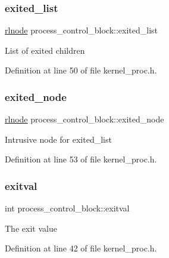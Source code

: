 \subsubsection{\texorpdfstring{exited\+\_\+list}{exited\_list}}
{\footnotesize\ttfamily \hyperlink{group__rlists_ga8f6244877f7ce2322c90525217ea6e7a}{rlnode} process\+\_\+control\+\_\+block\+::exited\+\_\+list}

List of exited children 

Definition at line 50 of file kernel\+\_\+proc.\+h.

\mbox{\label{structprocess__control__block_a9e0d93783a89bd92f39243353f04a27e}} 
\subsubsection{\texorpdfstring{exited\+\_\+node}{exited\_node}}
{\footnotesize\ttfamily \hyperlink{group__rlists_ga8f6244877f7ce2322c90525217ea6e7a}{rlnode} process\+\_\+control\+\_\+block\+::exited\+\_\+node}

Intrusive node for {\ttfamily exited\+\_\+list} 

Definition at line 53 of file kernel\+\_\+proc.\+h.

\mbox{\label{structprocess__control__block_add9b4f6d506a3538be7b53411e94fd28}} 
\subsubsection{\texorpdfstring{exitval}{exitval}}
{\footnotesize\ttfamily int process\+\_\+control\+\_\+block\+::exitval}

The exit value 

Definition at line 42 of file kernel\+\_\+proc.\+h.

\mbox{\label{structprocess__control__block_aad72d85bd79a3100a497d11630a38977}} 
